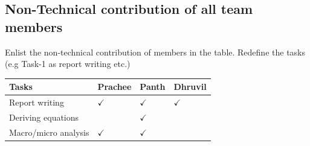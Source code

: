\documentclass{article}
\begin{document}
\subsection{Non-Technical contribution of all team members }
Enlist the non-technical contribution of members in the table. Redefine the tasks (e.g Task-1 as report writing etc.)
\begin{table}[h]
  \centering
  \begin{tabular}{|l|l|l|l|}
    \hline
    Tasks  & Prachee       & Panth         & Dhruvil \\ \hline
    Report writing &     $\checkmark$          &      $\checkmark$          &   $\checkmark$\\ \hline
    Deriving equations &           &     $\checkmark$           &    \\ \hline
    Macro/micro analysis&            $\checkmark$    &         $\checkmark$       &               \\ \hline
  \end{tabular}
\end{table}



\end{document}
